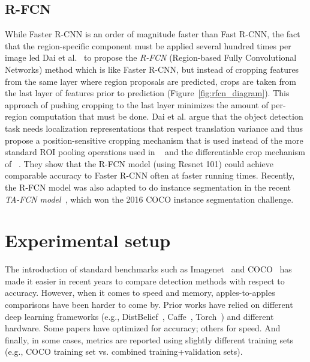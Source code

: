 \documentclass[10pt,twocolumn,letterpaper]{article}
\newcommand{\Jon}[1]{}
\begin{document}
\subsection{R-FCN}
While Faster R-CNN is an order of magnitude faster than Fast R-CNN, the fact that the region-specific component must be applied several hundred times per image led Dai et al.~\cite{dai2016r} to propose the \emph{R-FCN} (Region-based Fully Convolutional Networks) method which is like Faster R-CNN, but instead of cropping features from the same layer where region proposals are predicted, crops are taken from the last layer of features prior to prediction (Figure~\ref{fig:rfcn_diagram}).  This approach of pushing cropping to the last layer minimizes the amount of per-region computation that must be done.
Dai et al. argue that the object detection task needs localization representations that respect translation variance and thus propose a position-sensitive cropping mechanism that is used instead of the more standard ROI pooling operations used in ~\cite{girshick2015fast,ren2015faster} and the differentiable crop mechanism of ~\cite{dai2015instance}.  They show that the R-FCN model (using Resnet 101) could achieve comparable accuracy to Faster R-CNN often at faster running times.  Recently, the R-FCN model was also adapted to do instance segmentation in the recent \emph{TA-FCN model}~\cite{li16}, which won the 2016 COCO instance segmentation challenge.





\Jon{we are missing the Gidaris papers}












 \section{Experimental setup}
\label{sec:methods}
\vspace{-2mm}
The introduction of standard benchmarks such as Imagenet~\cite{russakovsky2015imagenet} and COCO~\cite{Lin2014coco} has made it easier in recent years to compare detection methods with respect to accuracy.  However, when it comes to speed and memory, apples-to-apples comparisons have been harder to come by. Prior works have relied on different deep learning frameworks (e.g., DistBelief~\cite{dean2012large}, Caffe~\cite{jia2014caffe}, Torch~\cite{collobert2011torch7}) and different hardware.  Some papers have optimized for accuracy; others for speed.  
And finally, in some cases, metrics are reported using slightly different training sets (e.g., COCO training set vs. combined training+validation sets).
\end{document}
